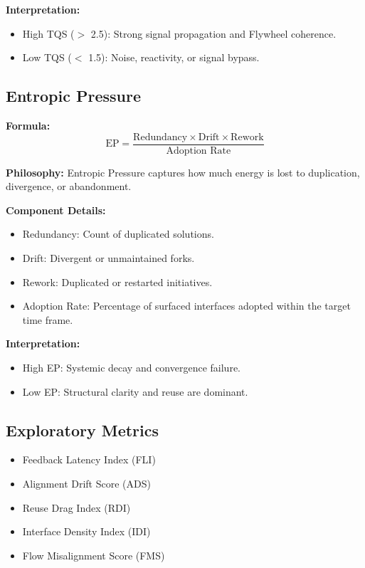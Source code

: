\documentclass[12pt]{article}
\begin{document}
\textbf{Interpretation:}
\begin{itemize}
    \item High TQS ($>$ 2.5): Strong signal propagation and Flywheel coherence.
    \item Low TQS ($<$ 1.5): Noise, reactivity, or signal bypass.
\end{itemize}

\subsection{Entropic Pressure}

\textbf{Formula:}
\[
\text{EP} = \frac{\text{Redundancy} \times \text{Drift} \times \text{Rework}}{\text{Adoption Rate}}
\]

\textbf{Philosophy:} Entropic Pressure captures how much energy is lost to duplication, divergence, or abandonment.

\textbf{Component Details:}
\begin{itemize}
    \item Redundancy: Count of duplicated solutions.
    \item Drift: Divergent or unmaintained forks.
    \item Rework: Duplicated or restarted initiatives.
    \item Adoption Rate: Percentage of surfaced interfaces adopted within the target time frame.
\end{itemize}

\textbf{Interpretation:}
\begin{itemize}
    \item High EP: Systemic decay and convergence failure.
    \item Low EP: Structural clarity and reuse are dominant.
\end{itemize}

\subsection{Exploratory Metrics}
\begin{itemize}
    \item Feedback Latency Index (FLI)
    \item Alignment Drift Score (ADS)
    \item Reuse Drag Index (RDI)
    \item Interface Density Index (IDI)
    \item Flow Misalignment Score (FMS)
\end{itemize}
\end{document}

